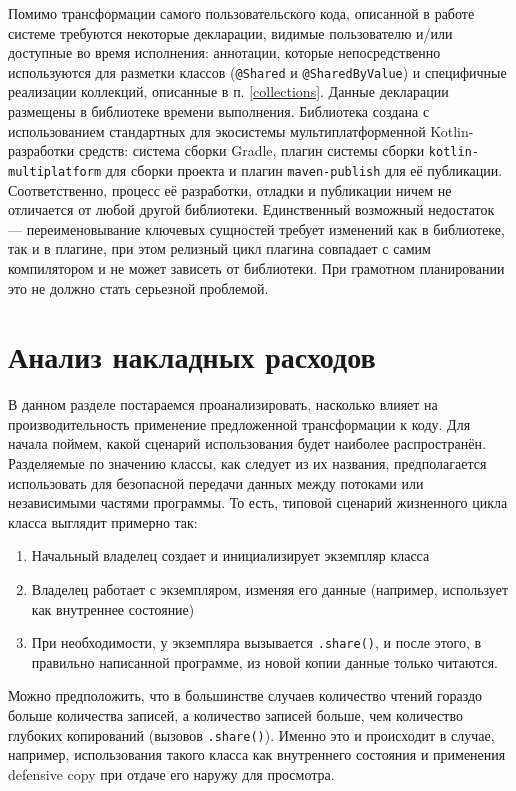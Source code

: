 \documentclass[specification,annotation,times]{itmo-student-thesis}
\begin{document}
Помимо трансформации самого пользовательского кода, описанной в работе системе требуются некоторые декларации, видимые пользователю и/или доступные во время исполнения: аннотации, которые непосредственно используются для разметки классов (\texttt{@Shared} и \texttt{@SharedByValue}) и специфичные реализации коллекций, описанные в п. \ref{collections}.
Данные декларации размещены в библиотеке времени выполнения. Библиотека создана с использованием стандартных для экосистемы мультиплатформенной Kotlin-разработки средств: система сборки Gradle, плагин системы сборки \texttt{kotlin-multiplatform} для сборки проекта и плагин \texttt{maven-publish} для её публикации.
Соответственно, процесс её разработки, отладки и публикации ничем не отличается от любой другой библиотеки.
Единственный возможный недостаток --- переименовывание ключевых сущностей требует изменений как в библиотеке, так и в плагине, при этом релизный цикл плагина совпадает с самим компилятором и не может зависеть от библиотеки. При грамотном планировании это не должно стать серьезной проблемой.

\section{Анализ накладных расходов}

В данном разделе постараемся проанализировать, насколько влияет на производительность применение предложенной трансформации к коду.
Для начала поймем, какой сценарий использования будет наиболее распространён.
Разделяемые по значению классы, как следует из их названия, предполагается использовать для безопасной передачи данных между потоками или независимыми частями программы. То есть, типовой сценарий жизненного цикла класса выглядит примерно так:

\begin{enumerate}
	\item Начальный владелец создает и инициализирует экземпляр класса
	\item Владелец работает с экземпляром, изменяя его данные (например, использует как внутреннее состояние)
	\item При необходимости, у экземпляра вызывается \texttt{.share()}, и после этого, в правильно написанной программе, из новой копии данные только читаются.
\end{enumerate}


Можно предположить, что в большинстве случаев количество чтений гораздо больше количества записей, а количество записей больше, чем количество глубоких копирований (вызовов \texttt{.share()}).
Именно это и происходит в случае, например, использования такого класса как внутреннего состояния и применения defensive copy при отдаче его наружу для просмотра.
\end{document}
